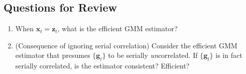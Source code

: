 \subsection*{Questions for Review}

\begin{enumerate}
\item When $\mathbf{x}_t = \mathbf{z}_t$, what is the efficient GMM estimator?

\item (Consequence of ignoring serial correlation) \; Consider the efficient GMM estimator
that presumes $\{\mathbf{g}_t\}$ to be serially \emph{un}correlated. If $\{\mathbf{g}_t\}$ is in fact serially
correlated, is the estimator consistent? Efficient?
\end{enumerate}
